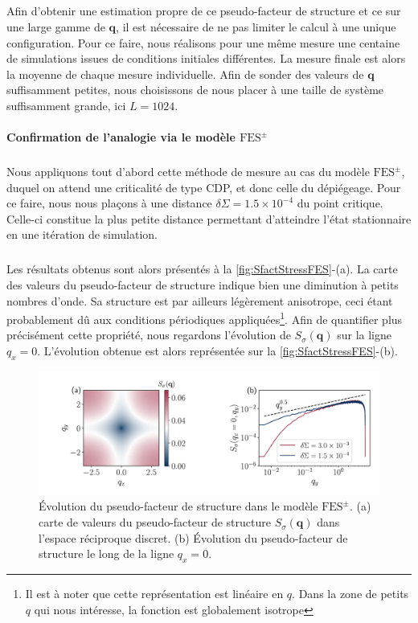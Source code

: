 \subparagraph{}Afin d'obtenir une estimation propre de ce pseudo-facteur de structure et ce sur une large gamme de $\mathbf{q}$, il est nécessaire de ne pas limiter le calcul à une unique configuration. Pour ce faire, nous réalisons pour une même mesure une centaine de simulations issues de conditions initiales différentes. La mesure finale est alors la moyenne de chaque mesure individuelle. Afin de sonder des valeurs de $\mathbf{q}$ suffisamment petites, nous choisissons de nous placer à une taille de système suffisamment grande, ici $L=1024$.

\paragraph{Confirmation de l'analogie via le modèle $\text{FES}^\pm$}

\subparagraph{}Nous appliquons tout d'abord cette méthode de mesure au cas du modèle $\text{FES}^\pm$, duquel on attend une criticalité de type CDP, et donc celle du dépiégeage. Pour ce faire, nous nous plaçons à une distance $\delta\Sigma = 1.5\times 10^{-4}$ du point critique. Celle-ci constitue la plus petite distance permettant d'atteindre l'état stationnaire en une itération de simulation.

\subparagraph{}Les résultats obtenus sont alors présentés à la \autoref{fig:SfactStressFES}-(a). La carte des valeurs du pseudo-facteur de structure indique bien une diminution à petits nombres d'onde. Sa structure est par ailleurs légèrement anisotrope, ceci étant probablement dû aux conditions périodiques appliquées\footnote{Il est à noter que cette représentation est linéaire en $q$. Dans la zone de petits $q$ qui nous intéresse, la fonction est globalement isotrope}. Afin de quantifier plus précisément cette propriété, nous regardons l'évolution de $S_\sigma(\mathbf{q})$ sur la ligne $q_x = 0$. L'évolution obtenue est alors représentée sur la \autoref{fig:SfactStressFES}-(b).

\begin{figure}[h]
	\centering	\includegraphics[width=\textwidth]{Chapitre4/Figures/Correlations/Sfact_SRPNC.pdf}
	\caption{Évolution du pseudo-facteur de structure dans le modèle $\text{FES}^\pm$. (a) carte de valeurs du pseudo-facteur de structure $S_\sigma(\mathbf{q})$ dans l'espace réciproque discret. (b) Évolution du pseudo-facteur de structure le long de la ligne $q_x=0$.}
	\label{fig:SfactStressFES}
\end{figure}

